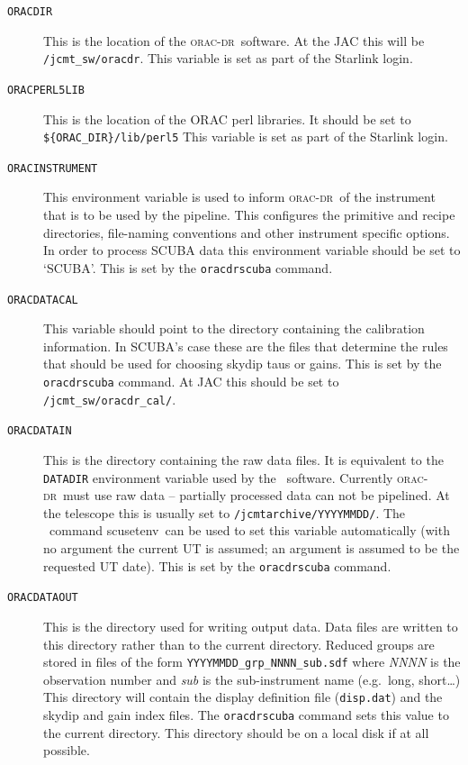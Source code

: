 \documentclass[twoside,11pt]{article}
\newcommand{\xref}[3]{#1}
\renewcommand{\_}{\texttt{\symbol{95}}}
\newcommand{\oracdr}{\xref{\textsc{orac-dr}}{sun230}{}}
\newcommand{\task}[1]{{\textsf{#1}}}
\newcommand{\SURF}{\xref{{\sc{Surf}}}{sun216}{}}
\newcommand{\scusetenv}{\xref{\task{scusetenv}}{sun216}{SCUSETENV}}
\begin{document}
\begin{description}
\item[\texttt{ORAC\_DIR}] \mbox{}

This is the location of the \oracdr\ software. At the JAC this will be
\verb|/jcmt_sw/oracdr|. This variable is set as part of the Starlink
login.

\item[\texttt{ORAC\_PERL5LIB}] \mbox{}

This is the location of the ORAC perl libraries. It should be set to
\verb|${ORAC_DIR}/lib/perl5|   %
This variable is set as part of the Starlink login.

\item[\texttt{ORAC\_INSTRUMENT}] \mbox{}

This environment variable is used to inform \oracdr\ of the instrument
that is to be used by the pipeline. This configures the primitive and recipe
directories, file-naming conventions and other instrument specific
options. In order to process SCUBA data this environment variable should
be set to `SCUBA'. This is set by the \texttt{oracdr\_scuba} command.

\item[\texttt{ORAC\_DATA\_CAL}] \mbox{}

This variable should point to the directory containing the calibration
information. In SCUBA's case these are the files that determine the rules
that should be used for choosing skydip taus or gains.
This is set by the \texttt{oracdr\_scuba} command.
At JAC this should be set to \verb|/jcmt_sw/oracdr_cal/|.

\item[\texttt{ORAC\_DATA\_IN}] \mbox{}

This is the directory containing the raw data files. It is equivalent
to the \texttt{DATADIR} environment variable used by the \SURF\ software.
Currently \oracdr\ must use raw data -- partially processed data can not
be pipelined. At the telescope this is usually set to
\verb|/jcmtarchive/YYYYMMDD/|. The \SURF\ command \scusetenv\
can be used to set this variable automatically (with no argument
the current UT is assumed; an argument is assumed to be the requested
UT date). This is set by the \texttt{oracdr\_scuba} command.

\item[\texttt{ORAC\_DATA\_OUT}] \mbox{}

This is the directory used for writing output data. Data files are
written to this directory rather than to the current directory.
Reduced groups are stored in files of the form
\verb|YYYYMMDD_grp_NNNN_sub.sdf| where \textit{NNNN} is the observation
number and \textit{sub} is the sub-instrument name (e.g.\ long, short\ldots)
This directory will contain the display definition file (\verb|disp.dat|)
and the skydip and gain index files. The \texttt{oracdr\_scuba}
command sets this value to the current directory. This directory
should be on a local disk if at all possible.

\end{description}
\end{document}

